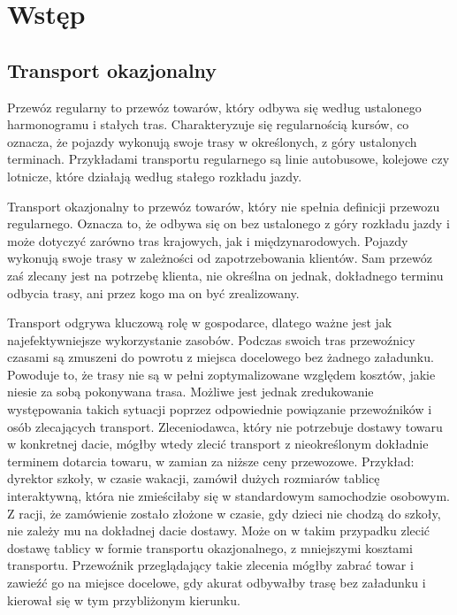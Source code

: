 \chapter{Wstęp}

\section{Transport okazjonalny}
\label{sec:przewoz_regularny}
Przewóz regularny to przewóz towarów, który odbywa się według ustalonego harmonogramu i stałych tras. Charakteryzuje się regularnością kursów, co oznacza, że pojazdy wykonują swoje trasy w określonych, z góry ustalonych terminach. Przykładami transportu regularnego są linie autobusowe, kolejowe czy lotnicze, które działają według stałego rozkładu jazdy.

\label{sec:transport_okazjonalny}
Transport okazjonalny to przewóz towarów, który nie spełnia definicji przewozu regularnego. Oznacza to, że odbywa się on bez ustalonego z góry rozkładu jazdy i może dotyczyć zarówno tras krajowych, jak i międzynarodowych. Pojazdy wykonują swoje trasy w zależności od zapotrzebowania klientów. Sam przewóz zaś zlecany jest na potrzebę klienta, nie określna on jednak, dokładnego terminu odbycia trasy, ani przez kogo ma on być zrealizowany.

Transport odgrywa kluczową rolę w gospodarce, dlatego ważne jest jak najefektywniejsze wykorzystanie zasobów. Podczas swoich tras przewoźnicy czasami są zmuszeni do powrotu z miejsca docelowego bez żadnego załadunku. Powoduje to, że trasy nie są w pełni zoptymalizowane względem kosztów, jakie niesie za sobą pokonywana trasa. Możliwe jest jednak zredukowanie występowania takich sytuacji poprzez odpowiednie powiązanie przewoźników i osób zlecających transport. Zleceniodawca, który nie potrzebuje dostawy towaru w konkretnej dacie, mógłby wtedy zlecić transport z nieokreślonym dokładnie terminem dotarcia towaru, w zamian za niższe ceny przewozowe. Przykład: dyrektor szkoły, w czasie wakacji, zamówił dużych rozmiarów tablicę interaktywną, która nie zmieściłaby się w standardowym samochodzie osobowym. Z racji, że zamówienie zostało złożone w czasie, gdy dzieci nie chodzą do szkoły, nie zależy mu na dokładnej dacie dostawy. Może on w takim przypadku zlecić dostawę tablicy w formie transportu okazjonalnego, z mniejszymi kosztami transportu. Przewoźnik przeglądający takie zlecenia mógłby zabrać towar i zawieźć go na miejsce docelowe, gdy akurat odbywałby trasę bez załadunku i kierował się w tym przybliżonym kierunku. 

